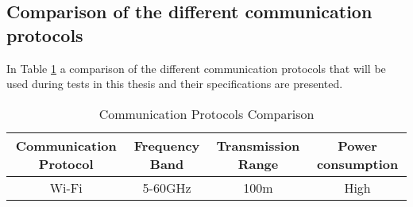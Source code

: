 \subsection{Comparison of the different communication protocols}
In Table \ref{CommunicationProtocolsComparison} a comparison of the different communication protocols that will be used during tests in this thesis and their specifications are presented. \\
\begin{table}[!hbtp]
\begin{tabular}{||c | c | c | c ||} 
 \hline
 Communication Protocol & Frequency Band & Transmission Range & Power consumption\\ [0.5ex]
 \hline\hline
 Wi-Fi & 5-60GHz & 100m & High\\ 
 \hline
\end{tabular}
\caption{Communication Protocols Comparison}
\label{CommunicationProtocolsComparison}
\end{table}